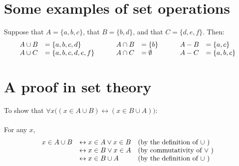 \documentclass[letterpaper]{article}
\begin{document}
	\section{\bf Some examples of set operations}
    	Suppose that $A = \{a,b,c\}$, that $B = \{b,d\}$, and that $C = \{d,e,f\}$. Then:
   		\begin{displaymath}
    		\begin{array}{llllll}
    			A \cup B & =\{a,b,c,d\} & \hspace{.3in} A \cap B & =\{b\} & \hspace{.3in} A-B & = \{a,c\} \\
                A \cup C & =\{a,b,c,d,e,f\} & \hspace{.3in} A \cap C & =\emptyset & \hspace{.3in} A-C & = \{a,b,c\} \\
    		\end{array}
   		\end{displaymath}
    \section{\bf A proof in set theory}
    	To show that $\forall x \big( (x \in A \cup B) \leftrightarrow (x \in B \cup A) \big)$: \\
        \\
        For any $x$,
        \begin{displaymath}
        	\begin{array}{lll}
        		x \in A \cup B & \leftrightarrow x \in A \vee x \in B & $(by the definition of $\cup$ )$ \\
                & \leftrightarrow x \in B \vee x \in A & $(by commutativity of $\vee$ )$ \\
                & \leftrightarrow x \in B \cup A & $(by the definition of $\cup$ )$\\
            \end{array}
        \end{displaymath}
\end{document}
